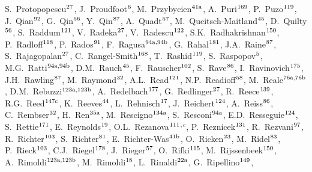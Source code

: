 \begin{flushleft}
S.~Protopopescu$^\textrm{\scriptsize 27}$,
J.~Proudfoot$^\textrm{\scriptsize 6}$,
M.~Przybycien$^\textrm{\scriptsize 41a}$,
A.~Puri$^\textrm{\scriptsize 169}$,
P.~Puzo$^\textrm{\scriptsize 119}$,
J.~Qian$^\textrm{\scriptsize 92}$,
G.~Qin$^\textrm{\scriptsize 56}$,
Y.~Qin$^\textrm{\scriptsize 87}$,
A.~Quadt$^\textrm{\scriptsize 57}$,
M.~Queitsch-Maitland$^\textrm{\scriptsize 45}$,
D.~Quilty$^\textrm{\scriptsize 56}$,
S.~Raddum$^\textrm{\scriptsize 121}$,
V.~Radeka$^\textrm{\scriptsize 27}$,
V.~Radescu$^\textrm{\scriptsize 122}$,
S.K.~Radhakrishnan$^\textrm{\scriptsize 150}$,
P.~Radloff$^\textrm{\scriptsize 118}$,
P.~Rados$^\textrm{\scriptsize 91}$,
F.~Ragusa$^\textrm{\scriptsize 94a,94b}$,
G.~Rahal$^\textrm{\scriptsize 181}$,
J.A.~Raine$^\textrm{\scriptsize 87}$,
S.~Rajagopalan$^\textrm{\scriptsize 27}$,
C.~Rangel-Smith$^\textrm{\scriptsize 168}$,
T.~Rashid$^\textrm{\scriptsize 119}$,
S.~Raspopov$^\textrm{\scriptsize 5}$,
M.G.~Ratti$^\textrm{\scriptsize 94a,94b}$,
D.M.~Rauch$^\textrm{\scriptsize 45}$,
F.~Rauscher$^\textrm{\scriptsize 102}$,
S.~Rave$^\textrm{\scriptsize 86}$,
I.~Ravinovich$^\textrm{\scriptsize 175}$,
J.H.~Rawling$^\textrm{\scriptsize 87}$,
M.~Raymond$^\textrm{\scriptsize 32}$,
A.L.~Read$^\textrm{\scriptsize 121}$,
N.P.~Readioff$^\textrm{\scriptsize 58}$,
M.~Reale$^\textrm{\scriptsize 76a,76b}$,
D.M.~Rebuzzi$^\textrm{\scriptsize 123a,123b}$,
A.~Redelbach$^\textrm{\scriptsize 177}$,
G.~Redlinger$^\textrm{\scriptsize 27}$,
R.~Reece$^\textrm{\scriptsize 139}$,
R.G.~Reed$^\textrm{\scriptsize 147c}$,
K.~Reeves$^\textrm{\scriptsize 44}$,
L.~Rehnisch$^\textrm{\scriptsize 17}$,
J.~Reichert$^\textrm{\scriptsize 124}$,
A.~Reiss$^\textrm{\scriptsize 86}$,
C.~Rembser$^\textrm{\scriptsize 32}$,
H.~Ren$^\textrm{\scriptsize 35a}$,
M.~Rescigno$^\textrm{\scriptsize 134a}$,
S.~Resconi$^\textrm{\scriptsize 94a}$,
E.D.~Resseguie$^\textrm{\scriptsize 124}$,
S.~Rettie$^\textrm{\scriptsize 171}$,
E.~Reynolds$^\textrm{\scriptsize 19}$,
O.L.~Rezanova$^\textrm{\scriptsize 111}$$^{,c}$,
P.~Reznicek$^\textrm{\scriptsize 131}$,
R.~Rezvani$^\textrm{\scriptsize 97}$,
R.~Richter$^\textrm{\scriptsize 103}$,
S.~Richter$^\textrm{\scriptsize 81}$,
E.~Richter-Was$^\textrm{\scriptsize 41b}$,
O.~Ricken$^\textrm{\scriptsize 23}$,
M.~Ridel$^\textrm{\scriptsize 83}$,
P.~Rieck$^\textrm{\scriptsize 103}$,
C.J.~Riegel$^\textrm{\scriptsize 178}$,
J.~Rieger$^\textrm{\scriptsize 57}$,
O.~Rifki$^\textrm{\scriptsize 115}$,
M.~Rijssenbeek$^\textrm{\scriptsize 150}$,
A.~Rimoldi$^\textrm{\scriptsize 123a,123b}$,
M.~Rimoldi$^\textrm{\scriptsize 18}$,
L.~Rinaldi$^\textrm{\scriptsize 22a}$,
G.~Ripellino$^\textrm{\scriptsize 149}$,
$$
\end{flushleft}

